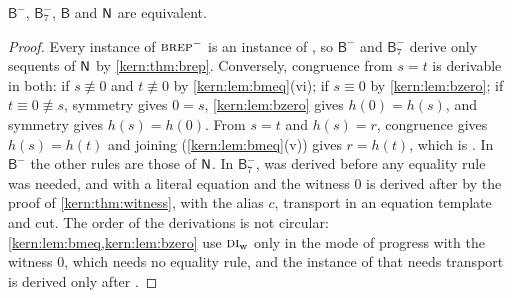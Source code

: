 \begin{theorem}
\label{kern:thm:bminus}
$\mathsf{B}^{-}$, $\mathsf{B}^{-}_{7}$, $\mathsf{B}$ and $\mathsf{N}$ are
equivalent.
\end{theorem}

\begin{proof}
Every instance of $\rulename{BRep}^{-}$ is an instance of , so
$\mathsf{B}^{-}$ and $\mathsf{B}^{-}_{7}$ derive only sequents of $\mathsf{N}$ by
\cref{kern:thm:brep}.  Conversely, congruence from $s=t$ is derivable in both:
if $s\not\equiv 0$ and $t\not\equiv 0$ by \cref{kern:lem:bmeq}(vi); if
$s\equiv 0$ by \cref{kern:lem:bzero}; if $t\equiv 0\not\equiv s$, symmetry
gives $0=s$, \cref{kern:lem:bzero} gives $h(0)=h(s)$, and symmetry gives
$h(s)=h(0)$.  From $s=t$ and $h(s)=r$, congruence gives $h(s)=h(t)$ and
joining (\cref{kern:lem:bmeq}(v)) gives $r=h(t)$, which is .  In
$\mathsf{B}^{-}$ the other rules are those of $\mathsf{N}$.  In
$\mathsf{B}^{-}_{7}$,  was derived before any equality rule
was needed, and  with a literal equation and the witness $0$ is
derived after  by the proof of \cref{kern:thm:witness}, with the
alias $c$, transport in an equation template and cut.  The order of the
derivations is not circular: \cref{kern:lem:bmeq,kern:lem:bzero} use
$\rulename{DI}_{\mathrm{w}}$ only in the mode of progress with the witness
$0$, which needs no equality rule, and the instance of  that
needs transport is derived only after .
\end{proof}


